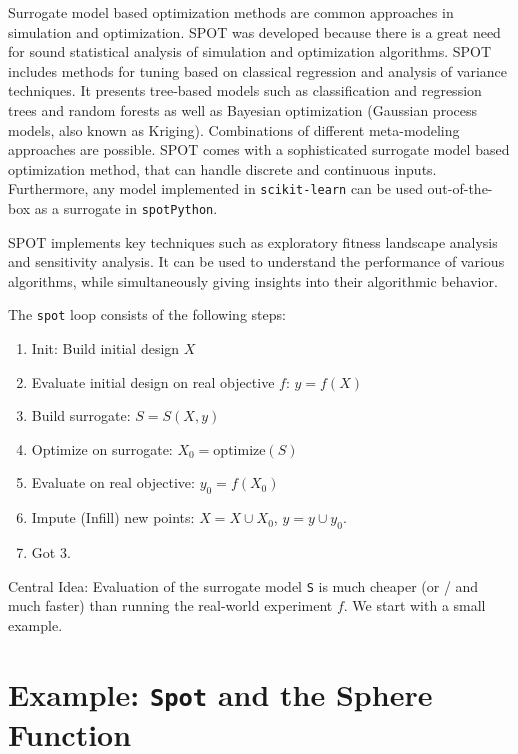 \documentclass[
  letterpaper,
  DIV=11,
  numbers=noendperiod]{scrreprt}
\providecommand{\tightlist}{%
  \setlength{\itemsep}{0pt}\setlength{\parskip}{0pt}}\usepackage{longtable,booktabs,array}
\begin{document}
Surrogate model based optimization methods are common approaches in
simulation and optimization. SPOT was developed because there is a great
need for sound statistical analysis of simulation and optimization
algorithms. SPOT includes methods for tuning based on classical
regression and analysis of variance techniques. It presents tree-based
models such as classification and regression trees and random forests as
well as Bayesian optimization (Gaussian process models, also known as
Kriging). Combinations of different meta-modeling approaches are
possible. SPOT comes with a sophisticated surrogate model based
optimization method, that can handle discrete and continuous inputs.
Furthermore, any model implemented in \texttt{scikit-learn} can be used
out-of-the-box as a surrogate in \texttt{spotPython}.

SPOT implements key techniques such as exploratory fitness landscape
analysis and sensitivity analysis. It can be used to understand the
performance of various algorithms, while simultaneously giving insights
into their algorithmic behavior.

The \texttt{spot} loop consists of the following steps:

\begin{enumerate}
\def\labelenumi{\arabic{enumi}.}
\tightlist
\item
  Init: Build initial design \(X\)
\item
  Evaluate initial design on real objective \(f\): \(y = f(X)\)
\item
  Build surrogate: \(S = S(X,y)\)
\item
  Optimize on surrogate: \(X_0 = \text{optimize}(S)\)
\item
  Evaluate on real objective: \(y_0 = f(X_0)\)
\item
  Impute (Infill) new points: \(X = X \cup X_0\), \(y = y \cup y_0\).
\item
  Got 3.
\end{enumerate}

Central Idea: Evaluation of the surrogate model \texttt{S} is much
cheaper (or / and much faster) than running the real-world experiment
\(f\). We start with a small example.

\hypertarget{example-spot-and-the-sphere-function}{%
\section{\texorpdfstring{Example: \texttt{Spot} and the Sphere
Function}{Example: Spot and the Sphere Function}}\label{example-spot-and-the-sphere-function}}
\end{document}

